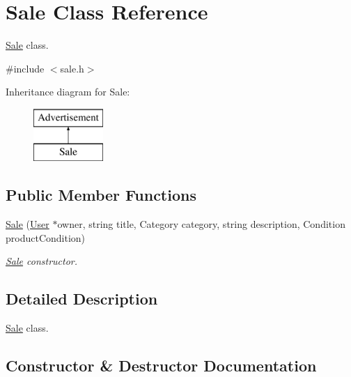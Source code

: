 \hypertarget{class_sale}{}\section{Sale Class Reference}
\label{class_sale}


\hyperlink{class_sale}{Sale} class.  




{\ttfamily \#include $<$sale.\+h$>$}

Inheritance diagram for Sale\+:\begin{figure}[H]
\begin{center}
\leavevmode
\includegraphics[height=2.000000cm]{class_sale}
\end{center}
\end{figure}
\subsection*{Public Member Functions}
\begin{DoxyCompactItemize}
\item 
\hyperlink{class_sale_ae5f5658a042eaaa8c080c1282d79f9ae}{Sale} (\hyperlink{class_user}{User} $\ast$owner, string title, Category category, string description, Condition product\+Condition)
\begin{DoxyCompactList}\small\item\em \hyperlink{class_sale}{Sale} constructor. \end{DoxyCompactList}\end{DoxyCompactItemize}


\subsection{Detailed Description}
\hyperlink{class_sale}{Sale} class. 

\subsection{Constructor \& Destructor Documentation}
\hypertarget{class_sale_ae5f5658a042eaaa8c080c1282d79f9ae}{}
